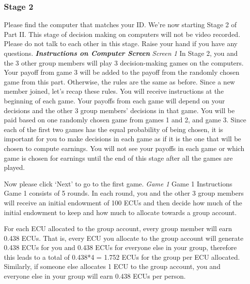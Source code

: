 \subsubsection{\textbf{Stage 2}}
\newline
Please find the computer that matches your ID. We’re now starting Stage 2 of Part II. This stage of decision making on computers will not be video recorded.  Please do not talk to each other in this stage. Raise your hand if you have any questions. 
\newline
\textbf{\textit{Instructions on Computer Screen}}
\newline
\textit{Screen 1}
\newline
In Stage 2, you and the 3 other group members will play 3 decision-making games on the computers. Your payoff from game 3 will be added to the payoff from the randomly chosen game from this part. Otherwise, the rules are the same as before. Since a new member joined, let’s recap these rules. You will receive instructions at the beginning of each game. Your payoffs from each game will depend on your decisions and the other 3 group members’ decisions in that game. You will be paid based on one randomly chosen game from games 1 and 2, and game 3. Since each of the first two games has the equal probability of being chosen, it is important for you to make decisions in each game as if it is the one that will be chosen to compute earnings. You will not see your payoffs in each game or which game is chosen for earnings until the end of this stage after all the games are played.

Now please click ‘Next’ to go to the first game.
\newline
\textit{Game 1}
\newline
Game 1 Instructions
\newline
Game 1 consists of 5 rounds. In each round, you and the other 3 group members will receive an initial endowment of 100 ECUs and then decide how much of the initial endowment to keep and how much to allocate towards a group account.

For each ECU allocated to the group account, every group member will earn 0.438 ECUs. That is, every ECU you allocate to the group account will generate 0.438 ECUs for you and 0.438 ECUs for everyone else in your group, therefore this leads to a total of 0.438*4 = 1.752 ECUs for the group per ECU allocated. Similarly, if someone else allocates 1 ECU to the group account, you and everyone else in your group will earn 0.438 ECUs per person.

